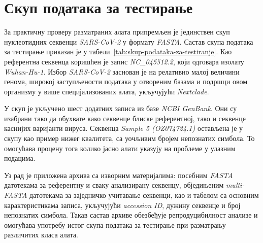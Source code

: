 \documentclass[12pt,oneside]{memoir}
\begin{document}
\section{Скуп података за тестирање}
\label{sec:skup-podataka-za-testiranje}
За практичну проверу разматраних алата припремљен је јединствен скуп нуклеотидних секвенци \textit{SARS-CoV-2} у формату \textit{FASTA}. Састав скупа података за тестирање приказан је у табели~\ref{tab:skup-podataka-za-testiranje}. Као референтна секвенца коришћен је запис \textit{NC\_045512.2}, који одговара изолату \textit{Wuhan-Hu-1}. Избор \textit{SARS-CoV-2} заснован је на релативно малој величини генома, широкој заступљености података у отвореним базама и подршци овом организму у више специјализованих алата, укључујући \textit{Nextclade}.

У скуп је укључено шест додатних записа из базе \textit{NCBI GenBank}. Они су изабрани тако да обухвате како секвенце блиске референтној, тако и секвенце каснијих варијанти вируса. Секвенца \textit{Sample 5 (OZ074724.1)} остављена је у скупу као пример нижег квалитета, са уочљивим бројем непознатих симбола. То омогућава процену тога колико јасно алати указују на проблеме у улазним подацима.

Уз рад је приложена архива са изворним материјалима: посебним \textit{FASTA} датотекама за референтну и сваку анализирану секвенцу, обједињеним \textit{multi-FASTA} датотекама за заједничко учитавање секвенци, као и табелом са основним карактеристикама записа, укључујући \textit{accession ID}, дужину секвенце и број непознатих симбола. Такав састав архиве обезбеђује репродуцибилност анализе и омогућава употребу истог скупа података за тестирање при разматрању различитих класа алата.
\end{document}
